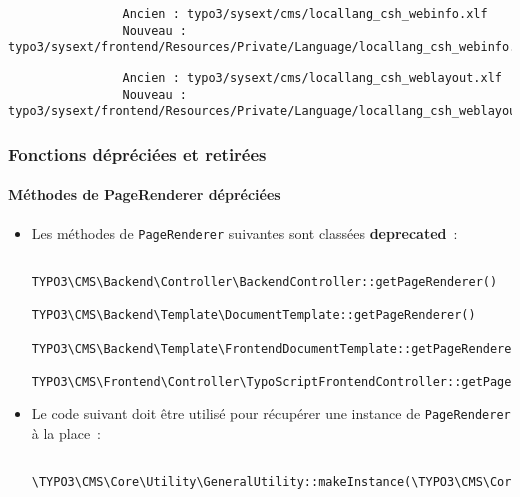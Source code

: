 \begin{frame}[fragile]
\begin{itemize}
\begin{lstlisting}
			\end{lstlisting}
			\vspace{-0.3cm}
			\begin{lstlisting}
				Ancien : typo3/sysext/cms/locallang_csh_webinfo.xlf
				Nouveau : typo3/sysext/frontend/Resources/Private/Language/locallang_csh_webinfo.xlf
			\end{lstlisting}
			\vspace{-0.3cm}
			\begin{lstlisting}
				Ancien : typo3/sysext/cms/locallang_csh_weblayout.xlf
				Nouveau : typo3/sysext/frontend/Resources/Private/Language/locallang_csh_weblayout.xlf
			\end{lstlisting}

	\end{itemize}

\end{frame}


\begin{frame}[fragile]
	\frametitle{Fonctions dépréciées et retirées}
	\framesubtitle{Méthodes de PageRenderer dépréciées}

	\lstset{basicstyle=\tiny\ttfamily}

	\begin{itemize}
		\item Les méthodes de \texttt{PageRenderer} suivantes sont classées \textbf{deprecated}~:

			\begin{lstlisting}
				TYPO3\CMS\Backend\Controller\BackendController::getPageRenderer()
				TYPO3\CMS\Backend\Template\DocumentTemplate::getPageRenderer()
				TYPO3\CMS\Backend\Template\FrontendDocumentTemplate::getPageRenderer()
				TYPO3\CMS\Frontend\Controller\TypoScriptFrontendController::getPageRenderer()
			\end{lstlisting}

		\item Le code suivant doit être utilisé pour récupérer une instance de \texttt{PageRenderer} à la place~:

			\begin{lstlisting}
				\TYPO3\CMS\Core\Utility\GeneralUtility::makeInstance(\TYPO3\CMS\Core\Page\PageRenderer::class)
			\end{lstlisting}

	\end{itemize}

\end{frame}

